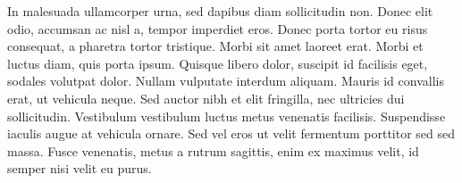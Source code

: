 \documentclass{article}
\begin{document}
In malesuada ullamcorper urna, sed dapibus diam sollicitudin non. Donec elit odio, accumsan ac nisl a, tempor imperdiet eros. Donec porta tortor eu risus consequat, a pharetra tortor tristique. Morbi sit amet laoreet erat. Morbi et luctus diam, quis porta ipsum. Quisque libero dolor, suscipit id facilisis eget, sodales volutpat dolor. Nullam vulputate interdum aliquam. Mauris id convallis erat, ut vehicula neque. Sed auctor nibh et elit fringilla, nec ultricies dui sollicitudin. Vestibulum vestibulum luctus metus venenatis facilisis. Suspendisse iaculis augue at vehicula ornare. Sed vel eros ut velit fermentum porttitor sed sed massa. Fusce venenatis, metus a rutrum sagittis, enim ex maximus velit, id semper nisi velit eu purus.







\end{document}
